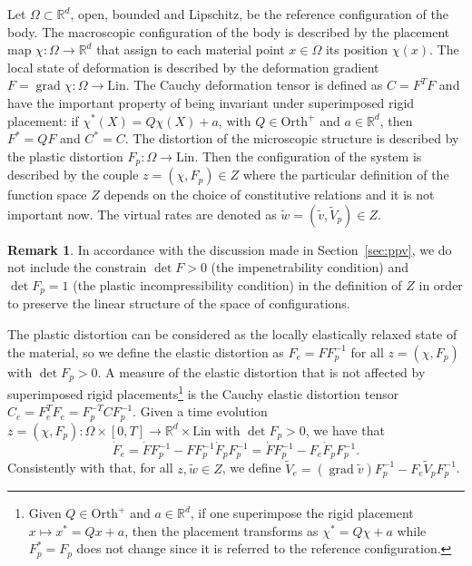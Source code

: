 \documentclass[a4paper,10pt,twoside]{amsbook}
\numberwithin{section}{chapter}
\numberwithin{equation}{chapter}
\theoremstyle{definition}
\newtheorem{rmk}[prop]{Remark}
\DeclareMathOperator{\grad}{grad}
\begin{document}
Let $\Omega\subset\mathbb{R}^d$, open, bounded and Lipschitz, be the reference configuration of the body. The macroscopic configuration of the body is described by the placement map $\chi\colon\Omega\to\mathbb{R}^d$ that assign to each material point $x\in\Omega$ its position $\chi(x)$. The local state of deformation is described by the deformation gradient $F=\grad\chi\colon\Omega\to\text{Lin}$. The Cauchy deformation tensor is defined as $C=F^TF$ and have the important property of being invariant under superimposed rigid placement: if $\chi^*(X)=Q\chi(X)+a$, with $Q\in\text{Orth}^+$ and $a\in\mathbb{R}^d$, then $F^*=QF$ and $C^*=C$. The distortion of the microscopic structure is described by the plastic distortion $F_p\colon\Omega\to\text{Lin}$. Then the configuration of the system is described by the couple $z=(\chi,F_p)\in Z$ where the particular definition of the function space $Z$ depends on the choice of constitutive relations and it is not important now. The virtual rates are denoted as $\tilde w=(\tilde v,\tilde V_p)\in Z$.
\begin{rmk}
In accordance with the discussion made in Section~\ref{sec:ppv}, we do not include the constrain $\det F>0$ (the impenetrability condition) and $\det F_p=1$ (the plastic incompressibility condition) in the definition of $Z$ in order to preserve the linear structure of the space of configurations.
\end{rmk}

The plastic distortion can be considered as the locally elastically relaxed state of the material, so we define the elastic distortion as $F_e=FF_p^{-1}$ for all $z=(\chi,F_p)$ with $\det F_p>0$. A measure of the elastic distortion that is not affected by superimposed rigid placements\footnote{Given $Q\in\text{Orth}^+$ and $a\in\mathbb{R}^d$, if one superimpose the rigid placement $x\mapsto x^*=Qx+a$, then the placement transforms as $\chi^*=Q\chi+a$ while $F_p^*=F_p$ does not change since it is referred to the reference configuration.} is the Cauchy elastic distortion tensor $C_e=F_e^TF_e=F_p^{-T}CF_p^{-1}$. Given a time evolution $z=(\chi,F_p)\colon\Omega\times[0,T]\to\mathbb{R}^d\times\text{Lin}$ with $\det F_p>0$, we have that
\[
\dot F_e=\dot FF_p^{-1}-FF_p^{-1}\dot F_pF_p^{-1}=\dot FF_p^{-1}-F_e\dot F_pF_p^{-1}.
\]
Consistently with that, for all $z,\tilde w\in Z$, we define $\tilde V_e=(\grad\tilde v)F_p^{-1}-F_e\tilde V_pF_p^{-1}$.
\end{document}
